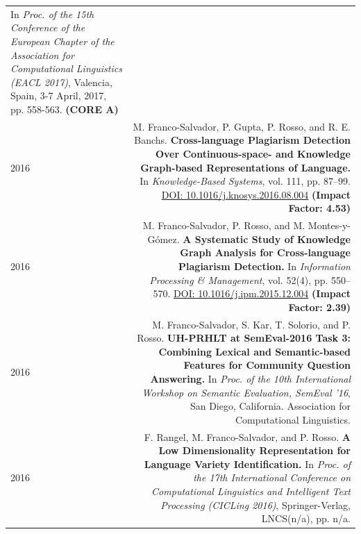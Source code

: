 \documentclass[10pt]{article}
\begin{document}
\begin{tabular}{L!{\VRule}R}
	In \emph{Proc. of the 15th Conference of the European Chapter of the Association for Computational Linguistics (EACL 2017)}, Valencia, Spain, 3-7 April, 2017, pp. 558-563. \textbf{(CORE A)}\vspace{5pt}\\
	2016&M. Franco-Salvador, P. Gupta, P. Rosso, and R. E. Banchs. \textbf{Cross-language Plagiarism Detection Over Continuous-space- and Knowledge Graph-based Representations of Language.}
	In \emph{Knowledge-Based Systems}, vol. 111, pp. 87--99. \href{http://dx.doi.org/10.1016/j.knosys.2016.08.004}{DOI: 10.1016/j.knosys.2016.08.004} \textbf{(Impact Factor: 4.53)} \vspace{5pt}\\
	2016&M. Franco-Salvador, P. Rosso, and M. Montes-y-G{\'o}mez. \textbf{A Systematic Study of Knowledge Graph Analysis for Cross-language Plagiarism Detection.}
	In \emph{Information Processing \& Management}, vol. 52(4), pp. 550--570. \href{http://dx.doi.org/10.1016/j.ipm.2015.12.004}{DOI: 10.1016/j.ipm.2015.12.004} \textbf{(Impact Factor: 2.39)} \vspace{5pt}\\
	2016 &M. Franco-Salvador, S. Kar, T. Solorio, and P. Rosso. \textbf{UH-PRHLT at SemEval-2016 Task 3: Combining Lexical and Semantic-based Features for Community Question Answering.} In \emph{Proc. of the 10th International Workshop on Semantic Evaluation, SemEval '16}, San Diego, California. Association for Computational Linguistics. \vspace{5pt}\\
	2016 &F. Rangel, M. Franco-Salvador, and P. Rosso. \textbf{A Low Dimensionality Representation for Language Variety Identification.} In \emph{Proc. of the 17th International Conference on Computational Linguistics and Intelligent Text Processing (CICLing 2016)}, Springer-Verlag, LNCS(n/a), pp. n/a. \vspace{5pt}\\
\end{tabular}
\end{document}
